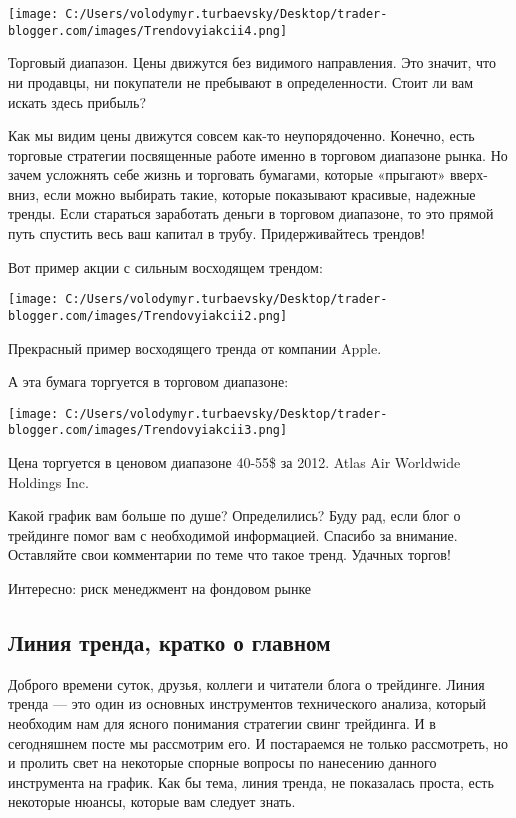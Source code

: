 \documentclass[a5paper]{article}
\begin{document}
\texttt{[image: C:/Users/volodymyr.turbaevsky/Desktop/trader-blogger.com/images/Trendovyiakcii4.png]}

Торговый диапазон. Цены движутся без видимого направления. Это значит, что ни продавцы, ни покупатели не пребывают в определенности. Стоит ли вам искать здесь прибыль?

Как мы видим цены движутся совсем как-то неупорядоченно. Конечно, есть торговые стратегии посвященные работе именно в торговом диапазоне рынка. Но зачем усложнять себе жизнь и торговать бумагами, которые «прыгают» вверх-вниз, если можно выбирать такие, которые показывают красивые, надежные тренды. Если стараться заработать деньги в торговом диапазоне, то это прямой путь спустить весь ваш капитал в трубу. Придерживайтесь трендов!

Вот пример акции с сильным восходящем трендом:

\texttt{[image: C:/Users/volodymyr.turbaevsky/Desktop/trader-blogger.com/images/Trendovyiakcii2.png]}

Прекрасный пример восходящего тренда от компании Apple.

А эта бумага торгуется в торговом диапазоне:

\texttt{[image: C:/Users/volodymyr.turbaevsky/Desktop/trader-blogger.com/images/Trendovyiakcii3.png]}

Цена торгуется в ценовом диапазоне 40-55\$ за 2012. Atlas Air Worldwide Holdings Inc.

Какой график вам больше по душе? Определились? Буду рад, если блог о трейдинге помог вам с необходимой информацией. Спасибо за внимание. Оставляйте свои комментарии по теме что такое тренд. Удачных торгов!

Интересно: риск менеджмент на фондовом рынке

\subsection{Линия тренда, кратко о главном}

Доброго времени суток, друзья, коллеги и читатели блога о
трейдинге. Линия тренда — это один из основных инструментов
технического анализа, который необходим нам для ясного понимания
стратегии свинг трейдинга. И в сегодняшнем посте мы рассмотрим его. И
постараемся не только рассмотреть, но и пролить свет на некоторые
спорные вопросы по нанесению данного инструмента на график. Как бы
тема, линия тренда, не показалась проста, есть некоторые нюансы,
которые вам следует знать.
\end{document}
